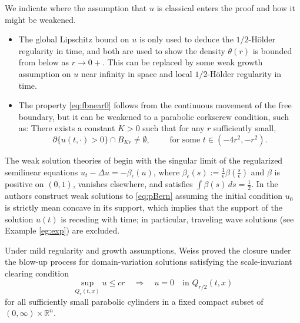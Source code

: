 \documentclass[11pt]{article}
\numberwithin{equation}{section}
\theoremstyle{definition}
\begin{document}
We indicate where the assumption that $u$ is classical enters the proof and how it might be weakened.
\begin{itemize}
    \item The global Lipschitz bound on $u$ is only used to deduce the $1/2$-H\"older regularity in time, and both are used to show the density $\theta(r)$ is bounded from below as $r\to 0+$. This can be replaced by some weak growth assumption on $u$ near infinity in space and local $1/2$-H\"older regularity in time.
    
    \item The property \eqref{eq:fbnear0} follows from the continuous movement of the free boundary, but it can be weakened to a parabolic corkscrew condition, such as: There exists a constant $K>0$ such that for any $r$ sufficiently small,
    \[ \partial\{u(t,\cdot)>0\} \cap B_{Kr} \neq \emptyset, \qquad \text{ for some } t\in (-4r^2,-r^2). \]
\end{itemize}


The weak solution theories of \cite{CV, Weiss99, Weiss} begin with the singular limit of the regularized semilinear equations $u_t - \Delta u = -\beta_\epsilon(u)$, where $\beta_\epsilon(s) := \frac{1}{\epsilon} \beta(\frac{s}{\epsilon})$ and $\beta$ is positive on $(0,1)$, vanishes elsewhere, and satisfies $\int \beta(s)\, ds = \frac12$. In \cite{CV} the authors construct weak solutions to \eqref{eq:pBern} assuming the initial condition $u_0$ is strictly mean concave in its support, which implies that the support of the solution $u(t)$ is receding with time; in particular, traveling wave solutions (see Example \ref{eg:exp}) are excluded. 

Under mild regularity and growth assumptions, Weiss \cite{Weiss99} proved the closure under the blow-up process for domain-variation solutions satisfying the scale-invariant clearing condition
\begin{equation}\label{eq:weiss-clearing}
    \sup_{Q_r(t,x)}u\leq cr \quad\Longrightarrow\quad u=0\quad\text{in }Q_{r/2}(t,x)
\end{equation}
for all sufficiently small parabolic cylinders in a fixed compact subset of $(0,\infty) \times \mathbb{R}^n$. 
\end{document}
